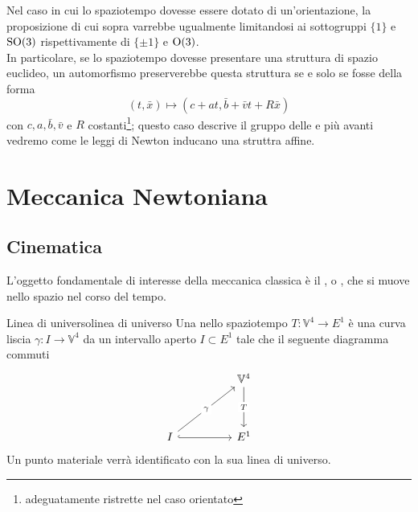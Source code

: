 \documentclass[openany]{book}
\renewcommand\V{\mathbb{V}}
\begin{document}
Nel caso in cui lo spaziotempo dovesse essere dotato di un'orientazione, la proposizione di cui sopra varrebbe ugualmente limitandosi ai sottogruppi $\{1\}$ e $\operatorname{SO}(3)$ rispettivamente di $\{\pm 1\}$ e $\operatorname{O}(3)$.\\
In particolare, se lo spaziotempo dovesse presentare una struttura di spazio euclideo, un automorfismo preserverebbe questa struttura se e solo se fosse della forma
\[ (t,\bar{x})\mapsto (c+at, \bar{b} + \bar{v}t + R\bar{x}) \]
con $c,a,\bar{b},\bar{v}$ e $R$ costanti\footnote{adeguatamente ristrette nel caso orientato}; questo caso descrive il gruppo delle  e più avanti vedremo come le leggi di Newton inducano una struttra affine.

\chapter{Meccanica Newtoniana}

\section{Cinematica}

L'oggetto fondamentale di interesse della meccanica classica è il , o , che si muove nello spazio nel corso del tempo. 

\begin{definition}{Linea di universo}{linea di universo}
    Una  nello spaziotempo $T:\V^4\to E^1$ è una curva liscia $\gamma : I \to \V^4$ da un intervallo aperto $I\subset E^1$ tale che il seguente diagramma commuti 
    \[\begin{tikzcd}
	    && {\V^4} \\
	    \\
	    I && {E^1}
	    \arrow["T"{description}, from=1-3, to=3-3]
	    \arrow["\gamma"{description}, from=3-1, to=1-3]
	    \arrow[hook, from=3-1, to=3-3]
    \end{tikzcd}\]
    Un punto materiale verrà identificato con la sua linea di universo.
\end{definition}
\end{document}
